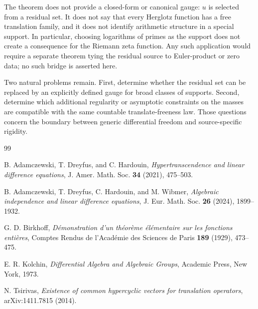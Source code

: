 \documentclass[11pt]{article}
\begin{document}
The theorem does not provide a closed-form or canonical gauge: $u$ is selected from a residual
set.  It does not say that every Herglotz function has a free translation family, and it does not
identify arithmetic structure in a special support.  In particular, choosing logarithms of
primes as the support does not create a consequence for the Riemann zeta function.  Any such
application would require a separate theorem tying the residual source to Euler-product or zero
data; no such bridge is asserted here.

Two natural problems remain.  First, determine whether the residual set can be replaced by an
explicitly defined gauge for broad classes of supports.  Second, determine which additional
regularity or asymptotic constraints on the masses are compatible with the same countable
translate-freeness law.  Those questions concern the boundary between generic differential
freedom and source-specific rigidity.

\begin{thebibliography}{99}

B. Adamczewski, T. Dreyfus, and C. Hardouin,
\emph{Hypertranscendence and linear difference equations},
J. Amer. Math. Soc. \textbf{34} (2021), 475--503.

B. Adamczewski, T. Dreyfus, C. Hardouin, and M. Wibmer,
\emph{Algebraic independence and linear difference equations},
J. Eur. Math. Soc. \textbf{26} (2024), 1899--1932.

G. D. Birkhoff,
\emph{D\'emonstration d'un th\'eor\`eme \'el\'ementaire sur les fonctions enti\`eres},
Comptes Rendus de l'Acad\'emie des Sciences de Paris \textbf{189} (1929), 473--475.

E. R. Kolchin,
\emph{Differential Algebra and Algebraic Groups},
Academic Press, New York, 1973.

N. Tsirivas,
\emph{Existence of common hypercyclic vectors for translation operators},
arXiv:1411.7815 (2014).

\end{thebibliography}
\end{document}

